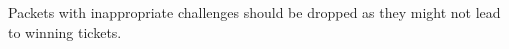 Packets with inappropriate challenges should be dropped as they might not lead to winning tickets.
\begin{comment}
 \begin{figure}[H]
    \centering
    \begin{tabular}{| m{2em} | m{15em} | m{2em} |}
        \hline
        $\alpha$ & $\beta$                   & $\gamma$ \\
                 & \begin{tabular}{| c m{2em} | m{3em} | m{6em} |}
            \hline
            \multicolumn{2}{| c |}{$Y_B$} & $hint_B$                 & $challenge_{BC}$ \\
            \hline
            \multicolumn{2}{| c |}{$Y_C$} & $hint_C$                 & $random$         \\
            \hline
            \multicolumn{2}{| c |}{$Y_D$} & $hint_D$                 & $random$         \\
            \hline
            End                           & \multicolumn{3}{| l |}{}                    \\
            \hline
        \end{tabular} &          \\[3em]
        \hline
    \end{tabular}
    \caption{SPHINX with PoR}
    \label{fig:SPHINX with PoR}
\end{figure}
\end{comment}
